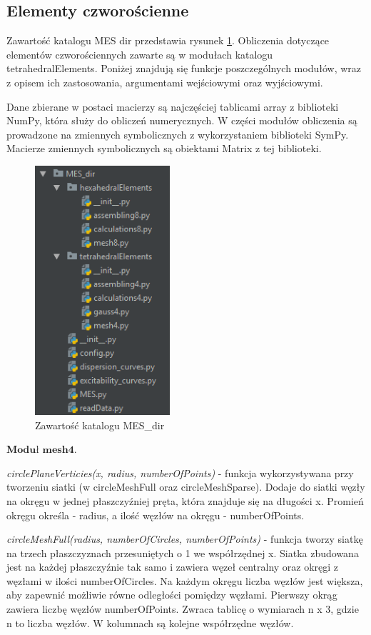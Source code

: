 
\subsection{Elementy czworościenne}
\label{cha:elementy czworościenne}

Zawartość katalogu MES dir przedstawia rysunek \ref{fig:okno_projektu_MES}. Obliczenia dotyczące elementów czworościennych zawarte są w modułach katalogu tetrahedralElements. Poniżej znajdują się funkcje poszczególnych modułów, wraz z opisem ich zastosowania, argumentami wejściowymi oraz wyjściowymi.

Dane zbierane w postaci macierzy są najczęściej tablicami array z biblioteki NumPy, która służy do obliczeń numerycznych. W części modułów obliczenia są prowadzone na zmiennych symbolicznych z wykorzystaniem biblioteki SymPy. Macierze zmiennych symbolicznych są obiektami Matrix z tej biblioteki.

\begin{figure}[h]
\centering
\includegraphics[width=5cm]{Zdjecia/5/okno_projektu_MES}
\caption{Zawartość katalogu MES\_dir}
\label{fig:okno_projektu_MES}
\end{figure}

\vspace {3mm}
 \( \textbf{Moduł mesh4} \).

\vspace {3mm}
\textit{circlePlaneVerticies(x, radius, numberOfPoints)} - funkcja wykorzystywana przy tworzeniu siatki (w circleMeshFull oraz circleMeshSparse). Dodaje do siatki węzły na okręgu w jednej płaszczyźniej pręta, która znajduje się na długości x. Promień okręgu określa - radius, a ilość węzłów na okręgu - numberOfPoints.

\vspace {3mm}
\textit{circleMeshFull(radius, numberOfCircles, numberOfPoints)} - funkcja tworzy siatkę na trzech płaszczyznach przesuniętych o 1 we współrzędnej x. Siatka zbudowana jest na każdej płaszczyźnie tak samo i zawiera węzeł centralny oraz okręgi z węzłami w ilości numberOfCircles. Na każdym okręgu liczba węzłów jest większa, aby zapewnić możliwie równe odległości pomiędzy węzłami. Pierwszy okrąg zawiera liczbę węzłów numberOfPoints. Zwraca tablicę o wymiarach n x 3, gdzie n to liczba węzłów. W kolumnach są kolejne współrzędne węzłów.

